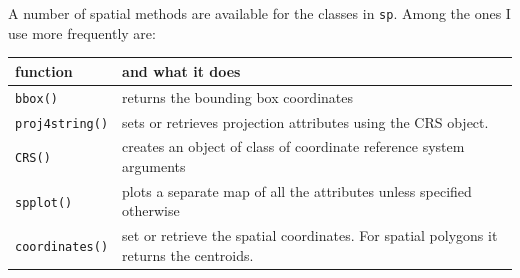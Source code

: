 \documentclass[]{book}
\theoremstyle{definition}
\theoremstyle{definition}
\theoremstyle{definition}
\theoremstyle{remark}
\begin{document}
A number of spatial methods are available for the classes in
\texttt{sp}. Among the ones I use more frequently are:

\begin{longtable}[]{@{}ll@{}}
\toprule
\begin{minipage}[b]{0.17\columnwidth}\raggedright\strut
function\strut
\end{minipage} & \begin{minipage}[b]{0.72\columnwidth}\raggedright\strut
and what it does\strut
\end{minipage}\tabularnewline
\midrule
\endhead
\begin{minipage}[t]{0.17\columnwidth}\raggedright\strut
\texttt{bbox()}\strut
\end{minipage} & \begin{minipage}[t]{0.72\columnwidth}\raggedright\strut
returns the bounding box coordinates\strut
\end{minipage}\tabularnewline
\begin{minipage}[t]{0.17\columnwidth}\raggedright\strut
\texttt{proj4string()}\strut
\end{minipage} & \begin{minipage}[t]{0.72\columnwidth}\raggedright\strut
sets or retrieves projection attributes using the CRS object.\strut
\end{minipage}\tabularnewline
\begin{minipage}[t]{0.17\columnwidth}\raggedright\strut
\texttt{CRS()}\strut
\end{minipage} & \begin{minipage}[t]{0.72\columnwidth}\raggedright\strut
creates an object of class of coordinate reference system
arguments\strut
\end{minipage}\tabularnewline
\begin{minipage}[t]{0.17\columnwidth}\raggedright\strut
\texttt{spplot()}\strut
\end{minipage} & \begin{minipage}[t]{0.72\columnwidth}\raggedright\strut
plots a separate map of all the attributes unless specified
otherwise\strut
\end{minipage}\tabularnewline
\begin{minipage}[t]{0.17\columnwidth}\raggedright\strut
\texttt{coordinates()}\strut
\end{minipage} & \begin{minipage}[t]{0.72\columnwidth}\raggedright\strut
set or retrieve the spatial coordinates. For spatial polygons it returns
the centroids.\strut

\end{minipage}
\end{longtable}
\end{document}
